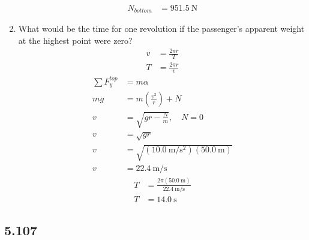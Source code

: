 \documentclass{article}
\begin{document}
\begin{enumerate}[label = \textbf{(\alph*)}]
\begin{align*}
			N_{bottom} & = \SI{951.5}{\newton}
		\end{align*}
	\item What would be the time for one revolution if the passenger’s apparent weight at the highest point were zero?
		\begin{align*}
			v & = \frac{ 2\pi r}{ T } \\
			T & = \frac{ 2\pi r }{ v }
		\end{align*}
		\begin{align*}
			\sum F_y^{top} & = m\alpha \\
			mg & = m \left( \frac{ v^2 }{ r } \right) + N \\
			v & = \sqrt{ gr - \frac{ N }{ m } }, \quad N = 0 \\
			v & = \sqrt{ gr } \\
			v & = \sqrt{ (\SI{10.0}{\meter \per \second \squared})(\SI{50.0}{\meter}) } \\
			v & = \SI{22.4}{\meter \per \second}
		\end{align*}
		\begin{align*}
			T & = \frac{ 2\pi (\SI{50.0}{\meter}) }{ \SI{22.4}{\meter \per \second} } \\
			T & = \SI{14.0}{\second}
		\end{align*}
\end{enumerate}

\subsection{5.107}
\end{document}
